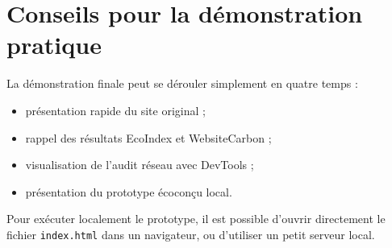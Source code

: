 \documentclass[11pt,a4paper]{article}
\begin{document}
\section{Conseils pour la démonstration pratique}

La démonstration finale peut se dérouler simplement en quatre temps :

\begin{itemize}
\item présentation rapide du site original ;
\item rappel des résultats EcoIndex et WebsiteCarbon ;
\item visualisation de l'audit réseau avec DevTools ;
\item présentation du prototype écoconçu local.
\end{itemize}

Pour exécuter localement le prototype, il est possible d'ouvrir directement le fichier \texttt{index.html} dans un navigateur, ou d'utiliser un petit serveur local.
\end{document}
